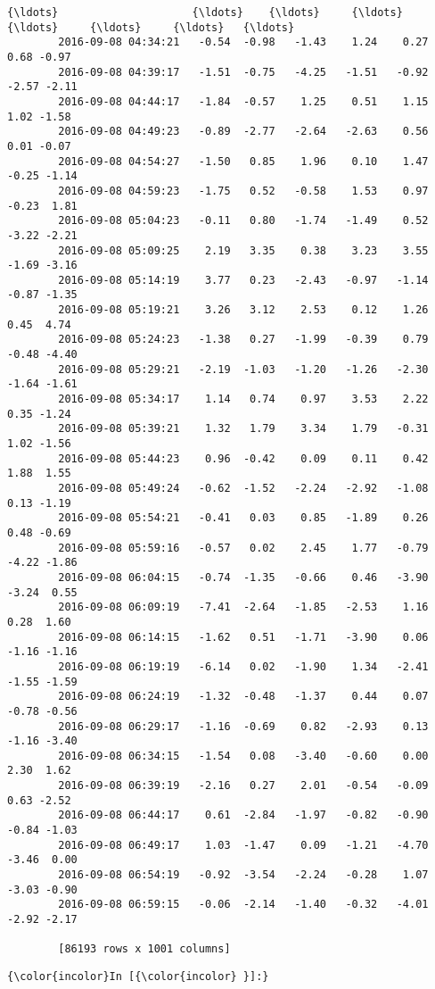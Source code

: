 \documentclass[a4paper,dvipdfmx]{jsarticle}
\begin{document}
\begin{Verbatim}[commandchars=\\\{\}]
        {\ldots}                     {\ldots}    {\ldots}     {\ldots}     {\ldots}     {\ldots}     {\ldots}   {\ldots}  
        2016-09-08 04:34:21   -0.54  -0.98   -1.43    1.24    0.27    0.68 -0.97  
        2016-09-08 04:39:17   -1.51  -0.75   -4.25   -1.51   -0.92   -2.57 -2.11  
        2016-09-08 04:44:17   -1.84  -0.57    1.25    0.51    1.15    1.02 -1.58  
        2016-09-08 04:49:23   -0.89  -2.77   -2.64   -2.63    0.56    0.01 -0.07  
        2016-09-08 04:54:27   -1.50   0.85    1.96    0.10    1.47   -0.25 -1.14  
        2016-09-08 04:59:23   -1.75   0.52   -0.58    1.53    0.97   -0.23  1.81  
        2016-09-08 05:04:23   -0.11   0.80   -1.74   -1.49    0.52   -3.22 -2.21  
        2016-09-08 05:09:25    2.19   3.35    0.38    3.23    3.55   -1.69 -3.16  
        2016-09-08 05:14:19    3.77   0.23   -2.43   -0.97   -1.14   -0.87 -1.35  
        2016-09-08 05:19:21    3.26   3.12    2.53    0.12    1.26    0.45  4.74  
        2016-09-08 05:24:23   -1.38   0.27   -1.99   -0.39    0.79   -0.48 -4.40  
        2016-09-08 05:29:21   -2.19  -1.03   -1.20   -1.26   -2.30   -1.64 -1.61  
        2016-09-08 05:34:17    1.14   0.74    0.97    3.53    2.22    0.35 -1.24  
        2016-09-08 05:39:21    1.32   1.79    3.34    1.79   -0.31    1.02 -1.56  
        2016-09-08 05:44:23    0.96  -0.42    0.09    0.11    0.42    1.88  1.55  
        2016-09-08 05:49:24   -0.62  -1.52   -2.24   -2.92   -1.08    0.13 -1.19  
        2016-09-08 05:54:21   -0.41   0.03    0.85   -1.89    0.26    0.48 -0.69  
        2016-09-08 05:59:16   -0.57   0.02    2.45    1.77   -0.79   -4.22 -1.86  
        2016-09-08 06:04:15   -0.74  -1.35   -0.66    0.46   -3.90   -3.24  0.55  
        2016-09-08 06:09:19   -7.41  -2.64   -1.85   -2.53    1.16    0.28  1.60  
        2016-09-08 06:14:15   -1.62   0.51   -1.71   -3.90    0.06   -1.16 -1.16  
        2016-09-08 06:19:19   -6.14   0.02   -1.90    1.34   -2.41   -1.55 -1.59  
        2016-09-08 06:24:19   -1.32  -0.48   -1.37    0.44    0.07   -0.78 -0.56  
        2016-09-08 06:29:17   -1.16  -0.69    0.82   -2.93    0.13   -1.16 -3.40  
        2016-09-08 06:34:15   -1.54   0.08   -3.40   -0.60    0.00    2.30  1.62  
        2016-09-08 06:39:19   -2.16   0.27    2.01   -0.54   -0.09    0.63 -2.52  
        2016-09-08 06:44:17    0.61  -2.84   -1.97   -0.82   -0.90   -0.84 -1.03  
        2016-09-08 06:49:17    1.03  -1.47    0.09   -1.21   -4.70   -3.46  0.00  
        2016-09-08 06:54:19   -0.92  -3.54   -2.24   -0.28    1.07   -3.03 -0.90  
        2016-09-08 06:59:15   -0.06  -2.14   -1.40   -0.32   -4.01   -2.92 -2.17  
        
        [86193 rows x 1001 columns]
\end{Verbatim}
        
    \begin{Verbatim}[commandchars=\\\{\}]
{\color{incolor}In [{\color{incolor} }]:} 
\end{Verbatim}


    
    
    
    
\end{document}
